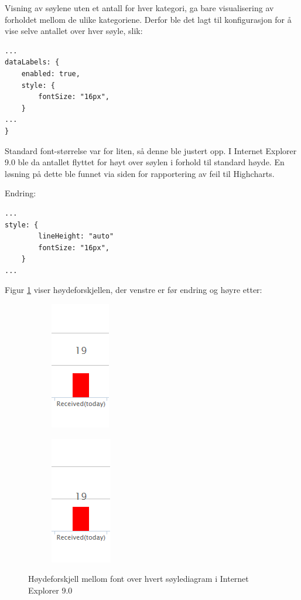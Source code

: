 Visning av søylene uten et antall for hver kategori, ga bare visualisering av forholdet mellom de ulike kategoriene. Derfor ble det lagt til konfigurasjon for å vise selve antallet over hver søyle, slik: 
\begin{lstlisting}
...
dataLabels: {
    enabled: true,
    style: {
        fontSize: "16px",
    }
...
}
\end{lstlisting}
Standard font-størrelse var for liten, så denne ble justert opp. I Internet Explorer 9.0 ble da antallet flyttet for høyt over søylen i forhold til standard høyde. En løsning på dette ble funnet via siden for rapportering av feil til Highcharts\cite{iebug}. 

Endring:
\begin{lstlisting}
...
style: {
        lineHeight: "auto"
        fontSize: "16px",
    }
...
\end{lstlisting}

Figur \ref{IE_bug} viser høydeforskjellen, der venstre er før endring og høyre etter:
\begin{figure}[H]
\centering
\begin{subfigure}
  \centering
  \includegraphics[scale=0.7]{img/IE_footprints_bug}
\end{subfigure}
\begin{subfigure}
  \centering
  \includegraphics[scale=0.7]{img/IE_footprints_fix}
\end{subfigure}
\caption{Høydeforskjell mellom font over hvert søylediagram i Internet Explorer 9.0}
\label{IE_bug}
\end{figure}

